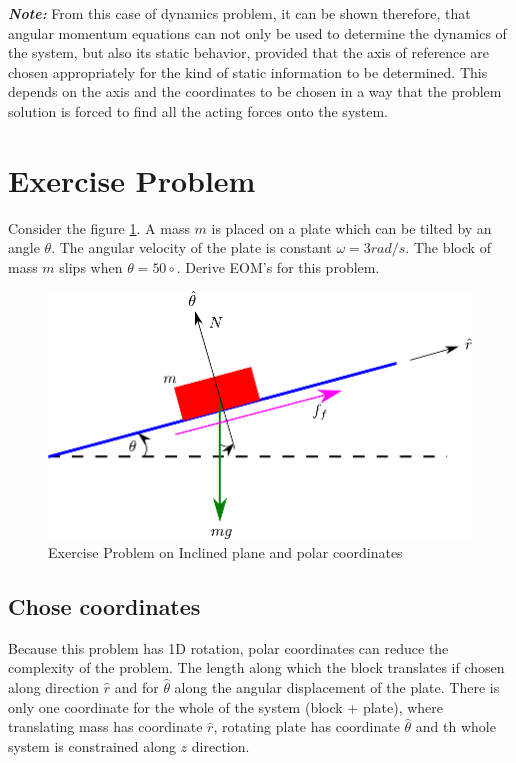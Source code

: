\textbf{\textit{Note: }}From this case of dynamics problem, it can be shown therefore, that angular momentum equations can not only be used to determine the dynamics of the system, but also its static behavior, provided that the axis of reference are chosen appropriately for the kind of static information to be determined. This depends on the axis and the coordinates to be chosen in a way that the problem solution is forced to find all the acting forces onto the system.

\section{Exercise Problem}

Consider the figure \ref{Fig_0_ch_2_ExerciseProblem}. A mass $m$ is placed on a plate which can be tilted by an angle $\theta$. The angular velocity of the plate is constant $\omega = 3 rad/s$. The block of mass $m$ slips when $\theta = 50 \circ$. Derive EOM's for this problem.
\begin{figure}[h!]
	\centering
	\includegraphics[width=0.65\linewidth]{Bilder/15_ExcersiceProblem.pdf}
	\caption{Exercise Problem on Inclined plane and polar coordinates}
	\label{Fig_0_ch_2_ExerciseProblem}
\end{figure}

\subsection{Chose coordinates}

Because this problem has 1D rotation, polar coordinates can reduce the complexity of the problem. The length along which the block translates if chosen along direction $\hat{r}$ and for $\hat{\theta}$ along the angular displacement of the plate. There is only one coordinate for the whole of the system (block + plate), where translating mass has coordinate $\hat{r}$, rotating plate has coordinate $\hat{\theta}$ and th whole system is constrained along $z$ direction.

